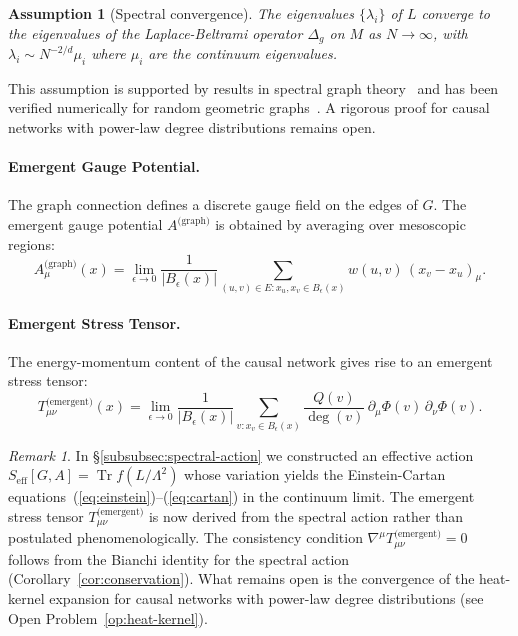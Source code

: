 \documentclass[11pt,a4paper]{article}
\newtheorem{assumption}[theorem]{Assumption}
\theoremstyle{definition}
\theoremstyle{remark}
\newtheorem{remark}{Remark}[section]
\newcommand{\Tem}{T^{\text{(emergent)}}}
\newcommand{\Agraph}{A^{\text{(graph)}}}
\newcommand{\Seff}{S_{\text{eff}}}
\begin{document}
\begin{assumption}[Spectral convergence]\label{ass:spectral}
The eigenvalues $\{\lambda_{i}\}$ of $L$ converge to the eigenvalues of the
Laplace-Beltrami operator $\Delta_{g}$ on $M$ as $N \to \infty$, with
$\lambda_{i} \sim N^{-2/d} \mu_{i}$ where $\mu_{i}$ are the continuum
eigenvalues.
\end{assumption}

This assumption is supported by results in spectral graph
theory~\cite{Belkin2006,Singer2006,Coifman2006} and has been verified
numerically for random geometric graphs~\cite{Belkin2006}. A rigorous proof for
causal networks with power-law degree distributions remains open.

\paragraph{Emergent Gauge Potential.} The graph connection defines a discrete
gauge field on the edges of $G$. The emergent gauge potential $\Agraph$ is
obtained by averaging over mesoscopic regions:
\begin{equation}
\Agraph_{\mu}(x) = \lim_{\epsilon \to 0}
\frac{1}{|B_{\epsilon}(x)|}
\sum_{(u,v) \in E: x_{u}, x_{v} \in B_{\epsilon}(x)}
w(u,v) \, (x_{v} - x_{u})_{\mu}.
\end{equation}

\paragraph{Emergent Stress Tensor.} The energy-momentum content of the causal
network gives rise to an emergent stress tensor:
\begin{equation}
\Tem_{\mu\nu}(x) = \lim_{\epsilon \to 0}
\frac{1}{|B_{\epsilon}(x)|}
\sum_{v: x_{v} \in B_{\epsilon}(x)}
\frac{Q(v)}{\deg(v)} \, \partial_{\mu} \Phi(v) \, \partial_{\nu} \Phi(v).
\end{equation}

\begin{remark}
In \S\ref{subsubsec:spectral-action} we constructed an effective action
$\Seff[G, A] = \operatorname{Tr} f(L/\Lambda^{2})$ whose variation yields the
Einstein-Cartan equations~(\ref{eq:einstein})--(\ref{eq:cartan}) in the
continuum limit. The emergent stress tensor $\Tem_{\mu\nu}$ is now derived from
the spectral action rather than postulated phenomenologically. The consistency
condition $\nabla^{\mu} \Tem_{\mu\nu} = 0$ follows from the Bianchi identity for
the spectral action (Corollary~\ref{cor:conservation}). What remains open is the
convergence of the heat-kernel expansion for causal networks with power-law
degree distributions (see Open Problem~\ref{op:heat-kernel}).
\end{remark}
\end{document}
